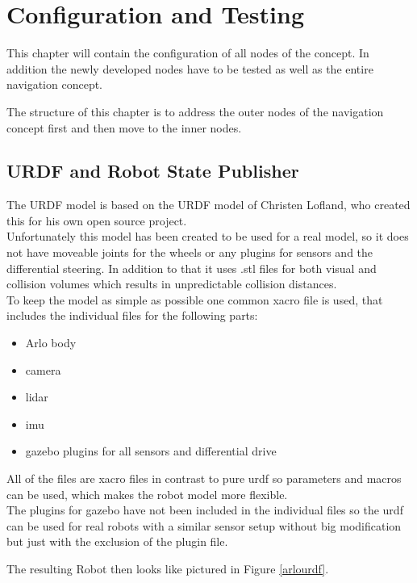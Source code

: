 \chapter{Configuration and Testing}
\label{configurationandtesting}
This chapter will contain the configuration of all nodes of the concept. In addition the newly developed nodes have to be tested as well as the entire navigation concept.


The structure of this chapter is to address the outer nodes of the navigation concept first and then move to the inner nodes.\\


\section{URDF and Robot State Publisher}

The URDF model is based on the URDF model of Christen Lofland, who created this for his own open source project\cite{chrisl8}.\\

Unfortunately this model has been created to be used for a real model, so it does not have moveable joints for the wheels or any plugins for sensors and the differential steering. In addition to that it uses .stl files for both visual and collision volumes which results in unpredictable collision distances.\\

To keep the model as simple as possible one common xacro file is used, that includes the individual files for the following parts:
\begin{itemize}
	\item Arlo body
	\item camera
	\item lidar
	\item imu
	\item gazebo plugins for all sensors and differential drive
\end{itemize}

All of the files are xacro files in contrast to pure urdf so parameters and macros can be used, which makes the robot model more flexible.\\

The plugins for gazebo have not been included in the individual files so the urdf can be used for real robots with a similar sensor setup without big modification but just with the exclusion of the plugin file.

The resulting Robot then looks like pictured in Figure \ref{arlourdf}.

